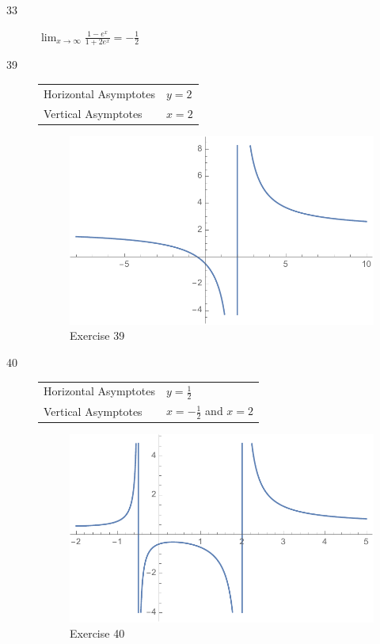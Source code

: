 \documentclass[letterpaper]{exam}
\begin{document}
\begin{description}
      \item[33] 
        $\lim_{x \to \infty} \frac{1 - e^x}{1 + 2e^x} = \boxed{ - \frac{1}{2} }$

      \item[39]
        \begin{tabular}[H]{ll}
          \toprule
          Horizontal Asymptotes & $y = 2$ \\
          Vertical Asymptotes   & $x = 2$ \\
          \bottomrule
        \end{tabular}

        \begin{figure}[H]
          \centering
          \includegraphics[scale = 0.5]{ex39.pdf}
          \caption{Exercise 39}
          \label{fig:ex39}
        \end{figure}

      \item[40]
        \begin{tabular}[H]{ll}
          \toprule
          Horizontal Asymptotes & $y = \frac{1}{2}$ \\
          Vertical Asymptotes   & $x = - \frac{1}{2}$ and $x = 2$ \\
          \bottomrule
        \end{tabular}

        \begin{figure}[H]
          \centering
          \includegraphics[scale = 0.5]{ex40.pdf}
          \caption{Exercise 40}
          \label{fig:ex40}
        \end{figure}


\end{description}
\end{document}
